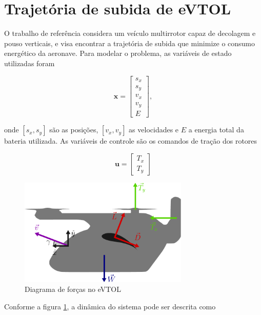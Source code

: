\section{Trajetória de subida de eVTOL}
\label{sec:evtol}

O trabalho de referência considera um veículo multirrotor capaz de decolagem e pouso verticais, e visa encontrar a trajetória de subida que minimize o consumo energético da aeronave. Para modelar o problema, as variáveis de estado utilizadas foram

\begin{equation}
    \mathbf{x} = \left[
    \begin{aligned}
        s_x \\
        s_y \\
        v_x \\
        v_y \\
        E
    \end{aligned}
    \right],
\end{equation}

\noindent onde $[s_x, s_y]$ são as posições, $[v_x, v_y]$ as velocidades e $E$ a energia total da bateria utilizada. As variáveis de controle são os comandos de tração dos rotores

\begin{equation}
    \mathbf{u} = \left[
    \begin{aligned}
        T_x \\
        T_y
    \end{aligned}
    \right]
\end{equation}

\begin{figure}[H]
    \centering
    \includegraphics[width=0.72\textwidth]{Cap3/eVTOL.pdf}
    \caption{Diagrama de forças no eVTOL}
    \label{fig:evtol-forças}
\end{figure}

Conforme a figura \ref{fig:evtol-forças}, a dinâmica do sistema pode ser descrita como

